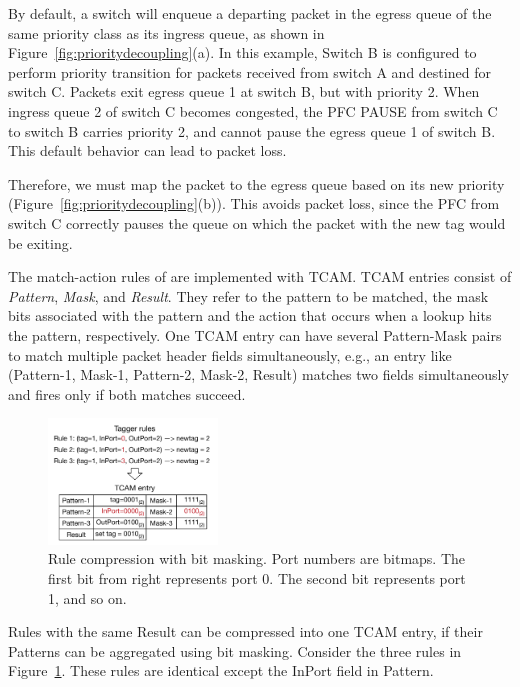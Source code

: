 By default, a switch will enqueue a departing packet in the egress queue
of the same priority class as its ingress queue, as shown in Figure~\ref{fig:prioritydecoupling}(a).
In this example, Switch B is configured to 
perform priority transition for packets received from switch A and destined for switch C.
Packets exit egress queue 1 at switch B, but with priority 2. 
When ingress queue 2 of switch C becomes congested, the PFC PAUSE from switch C 
to switch B carries priority 2, and cannot pause the egress queue 1 of switch B.
This default behavior can lead to packet loss.

Therefore, we must map the packet to the egress queue
based on its new priority (Figure~\ref{fig:prioritydecoupling}(b)).  
This avoids packet loss, since the PFC from switch C
correctly pauses the queue on which the packet with the new tag would be
exiting.

  The match-action rules of \sysname{}
are implemented with TCAM. TCAM entries consist of {\em Pattern},
{\em Mask}, and {\em Result}. They refer to the pattern to be matched, the mask bits 
associated with the pattern and the action that occurs when a lookup hits the pattern, 
respectively.  One TCAM entry can have several Pattern-Mask pairs to match multiple packet header fields
simultaneously, e.g., an entry like (Pattern-1, Mask-1, Pattern-2, Mask-2, Result)
matches two fields simultaneously and fires only if both matches succeed.

\begin{figure}
	\centering
	\includegraphics[width=0.4\textwidth] {figs/compression_with_bitmasking}
	\vspace{-1em}
	\caption{Rule compression with bit masking. Port numbers are bitmaps.
	The first bit from right represents port 0. The second bit represents port 1, and so on. }\label{fig:compression}
    \vspace{-1.5em}	
\end{figure}

Rules with the same Result can be compressed into one TCAM entry, if their
Patterns can be aggregated using bit masking. Consider the three
rules in Figure~\ref{fig:compression}. These rules are identical except the InPort
field in Pattern.

